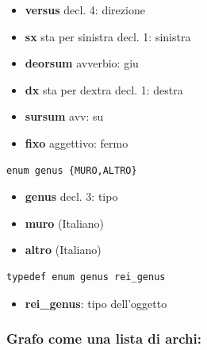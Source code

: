 \documentclass[8pt]{book}
\begin{document}
\begin{itemize}

\item
  \textbf{versus} decl. 4: direzione
\item
  \textbf{sx} sta per sinistra decl. 1: sinistra
\item
  \textbf{deorsum} avverbio: giu
\item
  \textbf{dx} sta per dextra decl. 1: destra
\item
  \textbf{sursum} avv: su
\item
  \textbf{fixo} aggettivo: fermo
\end{itemize}

\begin{spacing}{0.9}
  \begin{small}
    \begin{tcolorbox}
\begin{verbatim}
enum genus {MURO,ALTRO}
\end{verbatim}
  \end{tcolorbox}
    \end{small}
      \end{spacing}

\begin{itemize}

\item
  \textbf{genus} decl. 3: tipo
\item
  \textbf{muro} (Italiano)
\item
  \textbf{altro} (Italiano)
\end{itemize}

\begin{spacing}{0.9}
  \begin{small}
    \begin{tcolorbox}
\begin{verbatim}
typedef enum genus rei_genus
\end{verbatim}
  \end{tcolorbox}
    \end{small}
      \end{spacing}

\begin{itemize}

\item
  \textbf{rei\_genus}: tipo dell'oggetto
\end{itemize}

\subsubsection{Grafo come una lista di archi:}\label{graph-as-a-list-of-edges}
\end{document}
